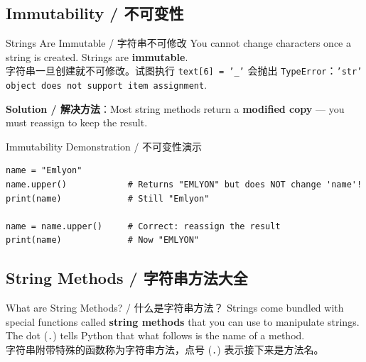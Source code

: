 \documentclass[11pt,a4paper]{article}
\begin{document}
\subsection{Immutability / 不可变性}

\begin{warning}{Strings Are Immutable / 字符串不可修改}
    You cannot change characters once a string is created. Strings are \textbf{immutable}. \\
    字符串一旦创建就不可修改。试图执行 \texttt{text[6] = '\_'} 会抛出 \texttt{TypeError}：\texttt{'str' object does not support item assignment}.

    \textbf{Solution / 解决方法}：Most string methods return a \textbf{modified copy} — you must reassign to keep the result.
\end{warning}

\begin{examplebox}{Immutability Demonstration / 不可变性演示}
\begin{lstlisting}
name = "Emlyon"
name.upper()            # Returns "EMLYON" but does NOT change 'name'!
print(name)             # Still "Emlyon"

name = name.upper()     # Correct: reassign the result
print(name)             # Now "EMLYON"
\end{lstlisting}
\end{examplebox}

\subsection{String Methods / 字符串方法大全}

\begin{concept}{What are String Methods? / 什么是字符串方法？}
    Strings come bundled with special functions called \textbf{string methods} that you can use to manipulate strings. The dot (\texttt{.}) tells Python that what follows is the name of a method. \\
    字符串附带特殊的函数称为字符串方法，点号 (\texttt{.}) 表示接下来是方法名。
\end{concept}
\end{document}
